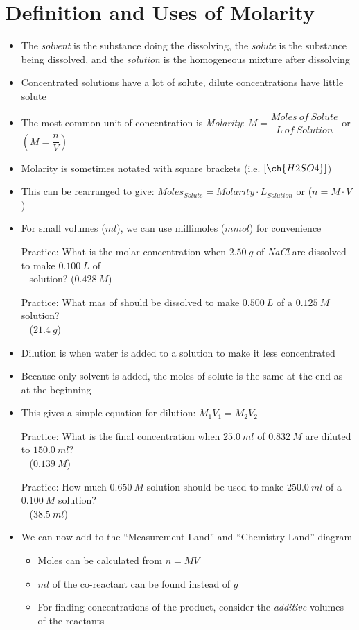\documentclass[12pt, openany, letterpaper]{memoir}
\begin{document}
\section{Definition and Uses of Molarity}
\begin{itemize}
	\item The \emph{solvent} is the substance doing the dissolving, the \emph{solute} is the substance being dissolved, and the \emph{solution} is the homogeneous mixture after dissolving
	\item Concentrated solutions have a lot of solute, dilute concentrations have little solute
	\item The most common unit of concentration is \emph{Molarity}: $M=\dfrac{Moles~of~Solute}{L~of~Solution}$ or $\left(M=\dfrac{n}{V}\right)$
	\item Molarity is sometimes notated with square brackets (i.e. $\left[\ch{H2SO4}\right]$)
	\item This can be rearranged to give: $Moles_{Solute} = Molarity \cdot L_{Solution}$ or ($n = M\cdot V$)
	\item For small volumes ($ml$), we can use millimoles ($mmol$) for convenience
	
	Practice: What is the molar concentration when $2.50~g$ of \emph{NaCl} are dissolved to make $0.100~L$ of\\ ~\hphantom{Practice: } solution? \hspace{1em} ($0.428~M$)
	
	Practice: What mas of  should be dissolved to make $0.500~L$ of a $0.125~M$ solution?\\ 
	~\hphantom{Practice: } ($21.4~g$)
	\item Dilution is when water is added to a solution to make it less concentrated
	\item Because only solvent is added, the moles of solute is the same at the end as at the beginning
	\item This gives a simple equation for dilution: $M_1V_1=M_2V_2$
	
	Practice: What is the final concentration when $25.0~ml$ of $0.832~M$ are diluted to $150.0~ml$?\\
	~\hphantom{Practice: } ($0.139~M$)
	
	Practice: How much $0.650~M$ solution should be used to make $250.0~ml$ of a $0.100~M$ solution?\\
	~\hphantom{Practice: } ($38.5~ml$)
	\item We can now add to the ``Measurement Land'' and ``Chemistry Land'' diagram
	\begin{itemize}
		\item Moles can be calculated from $n = MV$
		\item $ml$ of the co-reactant can be found instead of $g$
		\item For finding concentrations of the product, consider the \emph{additive} volumes of the reactants
	\end{itemize}
	

\end{itemize}
\end{document}
